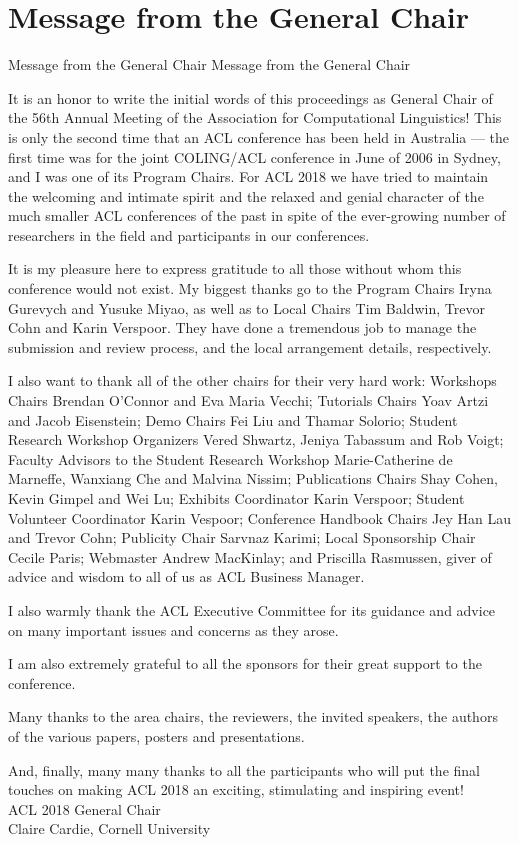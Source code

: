 \section{Message from the General Chair}\vspace{2em}
\setheaders%
    {Message from the General Chair}%
    {Message from the General Chair}
\thispagestyle{emptyheader}

\setlength{\parskip}{.7ex}

It is an honor to write the initial words of this proceedings as General Chair of the 56th Annual Meeting of the Association for Computational Linguistics!  This is only the second time that an ACL conference has been held in Australia --- the first time was for the joint COLING/ACL conference in June of 2006 in Sydney, and I was one of its Program Chairs.  For ACL 2018 we have tried to maintain the welcoming and intimate spirit and the relaxed and genial character of the much smaller ACL conferences of the past in spite of the ever-growing number of researchers in the field and participants in our conferences.

It is my pleasure here to express gratitude to all those without whom this
conference would not exist.  My  biggest  thanks  go  to the Program  Chairs Iryna Gurevych and Yusuke Miyao, as well as to Local Chairs Tim Baldwin, Trevor Cohn and Karin Verspoor.  They have done a tremendous job to manage the 
submission and review process, and the local arrangement details, respectively.

I also want to thank all of the other chairs for their very hard work:  Workshops  Chairs Brendan O'Connor and Eva Maria Vecchi;  Tutorials  Chairs Yoav Artzi
and Jacob Eisenstein; Demo Chairs Fei Liu and Thamar Solorio; Student Research Workshop Organizers Vered Shwartz, Jeniya Tabassum and Rob Voigt;  Faculty
Advisors to the Student Research Workshop Marie-Catherine de Marneffe, Wanxiang Che and Malvina Nissim; 
Publications Chairs Shay Cohen, Kevin Gimpel and Wei Lu; Exhibits Coordinator Karin Verspoor; Student Volunteer Coordinator Karin Vespoor; Conference Handbook Chairs Jey Han Lau and Trevor Cohn;
Publicity Chair Sarvnaz Karimi; Local Sponsorship Chair Cecile Paris; 
Webmaster Andrew MacKinlay; and Priscilla Rasmussen, giver of advice and wisdom  to all of us as ACL Business Manager.    

I also warmly thank the ACL Executive Committee for its guidance and advice on many important issues and concerns as they arose.

I am also extremely grateful to all the sponsors for their great support to the conference.

Many thanks to the area chairs, the reviewers, the invited speakers, the authors of the various papers, posters and presentations. 

And, finally, many many 
thanks to all the participants who will put the final touches on 
making ACL 2018 an exciting, stimulating and inspiring event! \\

\vspace{1.0em} 
\noindent ACL 2018 General Chair\\
Claire Cardie, Cornell University\\
